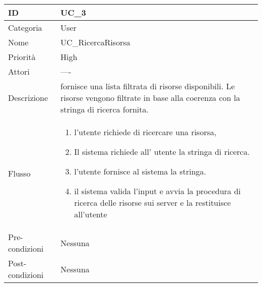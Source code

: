 \begin{center}
\begin{tabular}{ |p{2cm}|p{13cm}|  }
\hline
ID & UC\_3 \\\hline
Categoria & User \\\hline
Nome & UC\_RicercaRisorsa\\\hline
Priorità & High \\\hline
Attori &  ---- \\\hline
Descrizione & fornisce una lista filtrata di risorse disponibili. Le risorse vengono filtrate in base alla coerenza con la stringa di ricerca fornita.\\\hline
Flusso &  	\begin{enumerate}
			\item l'utente richiede di ricercare una risorsa,
			\item Il sistema richiede all' utente la stringa di ricerca.
			\item l'utente fornisce al sistema la stringa.
			\item il sistema valida l'input e avvia la procedura di ricerca delle risorse sui server e la restituisce all'utente %
			
		\end{enumerate}\\\hline
Pre-condizioni &  Nessuna\\\hline
Post-condizioni &  Nessuna\\\hline
\end{tabular}
\label{table_use_case:3}\newline


\end{center}
